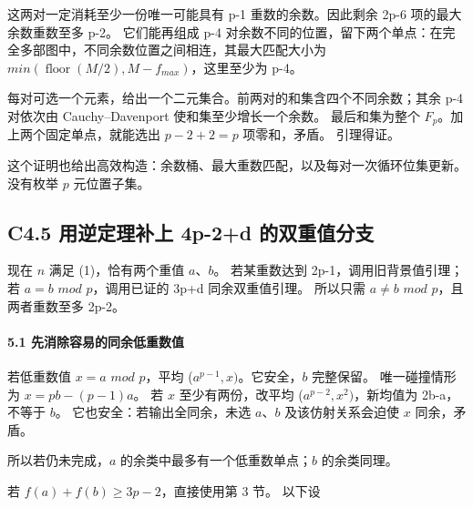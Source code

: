 {这两对一定消耗至少一份唯一可能具有} {p-1} {重数的余数。因此剩余} {2p-6} {项的最大余数重数至多} {p-2。} {它们能再组成} {p-4} {对余数不同的位置，留下两个单点：在完全多部图中，不同余数位置之间相连，其最大匹配大小为} {\ensuremath{min(\operatorname{floor}(M/2),M-f_{max})}，这里至少为} {p-4。}

{每对可选一个元素，给出一个二元集合。前两对的和集含四个不同余数；其余} {p-4} {对依次由} {Cauchy--Davenport} {使和集至少增长一个余数。} {最后和集为整个} {\ensuremath{F_{p}}。加上两个固定单点，就能选出} {\ensuremath{p-2+2=p}} {项零和，矛盾。} {引理得证。}

{这个证明也给出高效构造：余数桶、最大重数匹配，以及每对一次循环位集更新。没有枚举} {\ensuremath{p}} {元位置子集。}

\subsection*{\texorpdfstring{{C4.5} {用逆定理补上} {4p-2+d} {的双重值分支}}{C4.5 用逆定理补上 4p-2+d 的双重值分支}}\label{C4-h23}

{现在} {\ensuremath{n}} {满足} {(1)，恰有两个重值} {\ensuremath{a}、\ensuremath{b}。} {若某重数达到} {2p-1，调用旧背景值引理；若} {\ensuremath{a=b}} {\ensuremath{mod}} {\ensuremath{p}，调用已证的} {3p+d} {同余双重值引理。} {所以只需} {\ensuremath{a\ne b}} {\ensuremath{mod}} {\ensuremath{p}，且两者重数至多} {2p-2。}

\paragraph*{\texorpdfstring{{5.1} {先消除容易的同余低重数值}}{5.1 先消除容易的同余低重数值}}\label{C4-h24}

{若低重数值} {\ensuremath{x=a}} {\ensuremath{mod}} {\ensuremath{p}，平均} {(\ensuremath{a^{p-1},x)}。它安全，\ensuremath{b}} {完整保留。} {唯一碰撞情形为} {\ensuremath{x=pb-(p-1)a}。} {若} {\ensuremath{x}} {至少有两份，改平均} {(\ensuremath{a^{p-2},x^{2})}，新均值为} {2b-a，不等于} {\ensuremath{b}。} {它也安全：若输出全同余，未选} {\ensuremath{a}、\ensuremath{b}} {及该仿射关系会迫使} {\ensuremath{x}} {同余，矛盾。}

{所以若仍未完成，\ensuremath{a}} {的余类中最多有一个低重数单点；\ensuremath{b}} {的余类同理。}

{若} {\ensuremath{f(a)+f(b)\ge 3p-2}，直接使用第} {3} {节。} {以下设}

